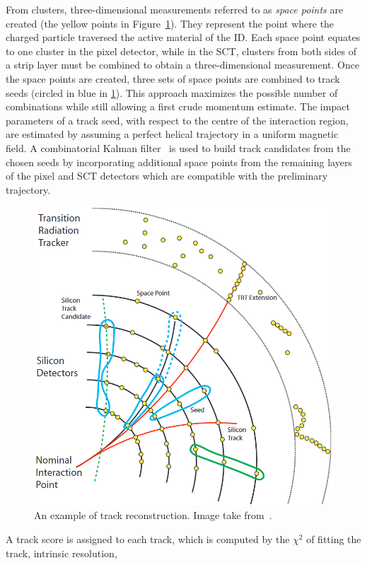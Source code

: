 From clusters, three-dimensional measurements referred to as
\textit{space points} are created (the yellow points in Figure~\ref{fig:track_recon}). 
They represent the point where the charged particle 
traversed the active material of the ID. 
Each space point equates to one cluster in the pixel detector, while in the SCT, 
clusters from both sides of a strip layer must be combined to obtain a three-dimensional measurement.
Once the space points are created, three sets of space points are combined to track seeds 
(circled in blue in \ref{fig:track_recon}). 
This approach maximizes the possible number of combinations while still allowing 
a first crude momentum estimate. The impact parameters of a track seed, 
with respect to the centre of the interaction region, are estimated by assuming 
a perfect helical trajectory in a uniform magnetic field.
A combinatorial Kalman filter~\cite{FRUHWIRTH1987444} is used to 
build track candidates from the chosen seeds by incorporating additional 
space points from the remaining layers of the pixel and SCT detectors which 
are compatible with the preliminary trajectory. 
\begin{figure}[bht]
    \begin{centering}	
    \includegraphics[width=.8\textwidth]{Reconstruction_plots/track.png}
    \caption{An example of track reconstruction. Image take from~\cite{ATLAS-CONF-2010-072}.
        }
    \label{fig:track_recon}
    \end{centering}
\end{figure}
A track score is assigned to each track,
which is computed by the $\chi^2$ of fitting the track, intrinsic resolution, 
